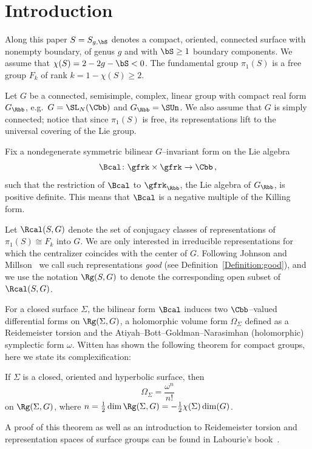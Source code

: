 \section{Introduction}\label{sec:intro}

Along this paper $S=S_{g,\bS}$ denotes a compact, oriented, connected surface with nonempty boundary, of genus $g$ and with $\bS\geq 1$ boundary components. We assume that $\chi(S)=2-2g-\bS<0$. The fundamental group $\pi_1(S)$ is a free group $F_k$ of rank $k=1-\chi(S)\geq 2$.

Let $G$ be a connected, semisimple, complex, linear group with compact real form $G_\Rbb$, e.g.~$G=\SL_N (\Cbb)$ and $G_\Rbb=\SUn$. We also assume that $G$ is simply connected; notice that since $\pi_1(S)$ is free, its representations lift to the universal covering of the Lie group.



Fix a nondegenerate symmetric bilinear $G$--invariant form on the Lie algebra
\[
\Bcal\colon \gfrk\times \gfrk \to \Cbb\,,
\]
such that the restriction of $\Bcal$ to $\gfrk_\Rbb$, the Lie algebra of $G_\Rbb$, is positive definite. This means that $\Bcal$ is a negative multiple of the Killing form.

Let $\Rcal(S,G)$ denote the set of conjugacy classes of representations of $\pi_1(S)\cong F_k$ into $G$. We are only interested in irreducible representations for which the centralizer coincides with the center of $G$. Following Johnson and Millson~\cite{JohnsonMillson} we call such representations \emph{good} (see Definition~\ref{Definition:good}), and we use the notation $\Rg(S,G)$ to denote the corresponding open subset of $\Rcal(S,G)$.



For a closed surface $\Sigma$, the bilinear form $\Bcal$ induces two $\Cbb$--valued differential forms on $ \Rg(\Sigma,G)$, a holomorphic volume form $\Omega_\Sigma$ defined as a Reidemeister torsion and the Atiyah--Bott--Goldman--Narasimhan (holomorphic) symplectic form $\omega$. Witten has shown the following theorem for compact groups, here we state its complexification:

\begin{theo}\label{Theorem:Witten}
If $\Sigma$ is a closed, oriented and hyperbolic surface, then
\[
\Omega_\Sigma=\frac{\omega^{n}}{n!}
\]
on $\Rg(\Sigma,G)$, where $n=\frac12\dim \Rg(\Sigma,G)=-\frac12\chi(\Sigma)\dim(G)$.
\end{theo}

A proof of this theorem as well as an introduction to Reidemeister torsion and representation spaces of surface groups can be found in Labourie's book~\cite{LabourieSG}.

